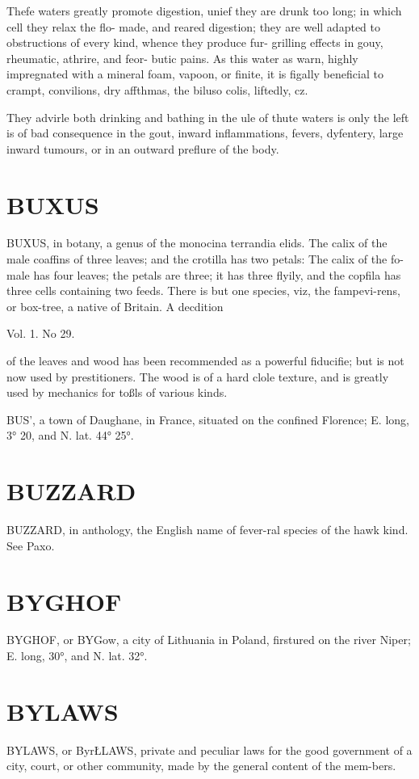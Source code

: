 \documentclass{article}
\begin{document}
Thefe waters greatly promote digestion, unief they are drunk too long; in which cell they relax the flo- made, and reared digestion; they are well adapted to obstructions of every kind, whence they produce fur- grilling effects in gouy, rheumatic, athrire, and feor- butic pains. As this water as warn, highly impregnated with a mineral foam, vapoon, or finite, it is figally beneficial to crampt, convilions, dry affthmas, the biluso colis, liftedly, cz.

They advirle both drinking and bathing in the ule of thute waters is only the left is of bad consequence in the gout, inward inflammations, fevers, dyfentery, large inward tumours, or in an outward preflure of the body.

\section*{BUXUS}
BUXUS, in botany, a genus of the monocina terrandia elids. The calix of the male coaffins of three leaves; and the crotilla has two petals: The calix of the fo- male has four leaves; the petals are three; it has three flyily, and the copfila has three cells containing two feeds. There is but one species, viz, the fampevi-rens, or box-tree, a native of Britain. A decdition

Vol. 1. No 29.

of the leaves and wood has been recommended as a powerful fiducifie; but is not now used by prestitioners. The wood is of a hard clole texture, and is greatly used by mechanics for toßls of various kinds.

BUS', a town of Daughane, in France, situated on the confined Florence; E. long, 3° 20, and N. lat. 44° 25°.

\section*{BUZZARD}
BUZZARD, in anthology, the English name of fever-ral species of the hawk kind. See Paxo.

\section*{BYGHOF}
BYGHOF, or BYGow, a city of Lithuania in Poland, firstured on the river Niper; E. long, 30°, and N. lat. 32°.

\section*{BYLAWS}
BYLAWS, or ByrŁLAWS, private and peculiar laws for the good government of a city, court, or other community, made by the general content of the mem-bers.
\end{document}
